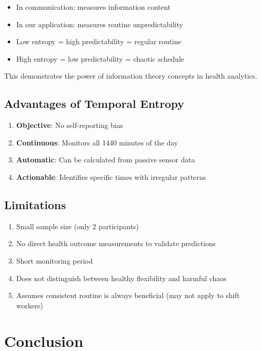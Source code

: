 \documentclass[12pt]{article}
\begin{document}
\begin{itemize}
    \item In communication: measures information content
    \item In our application: measures routine unpredictability
    \item Low entropy = high predictability = regular routine
    \item High entropy = low predictability = chaotic schedule
\end{itemize}

This demonstrates the power of information theory concepts in health analytics.

\subsection{Advantages of Temporal Entropy}

\begin{enumerate}
    \item \textbf{Objective}: No self-reporting bias
    \item \textbf{Continuous}: Monitors all 1440 minutes of the day
    \item \textbf{Automatic}: Can be calculated from passive sensor data
    \item \textbf{Actionable}: Identifies specific times with irregular patterns
\end{enumerate}

\subsection{Limitations}

\begin{enumerate}
    \item Small sample size (only 2 participants)
    \item No direct health outcome measurements to validate predictions
    \item Short monitoring period
    \item Does not distinguish between healthy flexibility and harmful chaos
    \item Assumes consistent routine is always beneficial (may not apply to shift workers)
\end{enumerate}

\section{Conclusion}
\end{document}
